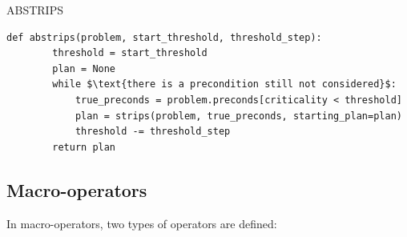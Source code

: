 \begin{algorithm}
\caption{ABSTRIPS}
\begin{lstlisting}[mathescape=true]
    def abstrips(problem, start_threshold, threshold_step):
        threshold = start_threshold
        plan = None
        while $\text{there is a precondition still not considered}$:
            true_preconds = problem.preconds[criticality < threshold]
            plan = strips(problem, true_preconds, starting_plan=plan)
            threshold -= threshold_step
        return plan
\end{lstlisting}
\end{algorithm}



\subsection{Macro-operators}
In macro-operators, two types of operators are defined:
